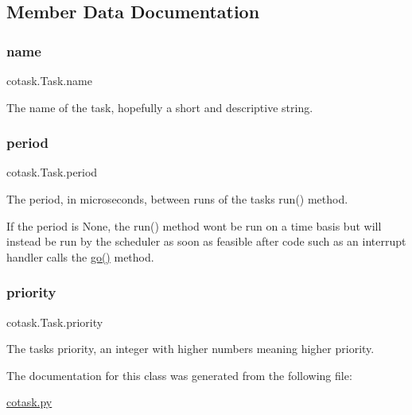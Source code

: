 \subsection{Member Data Documentation}
\mbox{\label{classcotask_1_1Task_ab54e069dd0b4f0a2f8e7f00c94998a10}} 
\subsubsection{\texorpdfstring{name}{name}}
{\footnotesize\ttfamily cotask.\+Task.\+name}



The name of the task, hopefully a short and descriptive string. 

\mbox{\label{classcotask_1_1Task_a44f980f61f1908764c6821fa886590ca}} 
\subsubsection{\texorpdfstring{period}{period}}
{\footnotesize\ttfamily cotask.\+Task.\+period}



The period, in microseconds, between runs of the task\textquotesingle{}s {\ttfamily run()} method. 

If the period is {\ttfamily None}, the {\ttfamily run()} method won\textquotesingle{}t be run on a time basis but will instead be run by the scheduler as soon as feasible after code such as an interrupt handler calls the {\ttfamily \mbox{\hyperlink{classcotask_1_1Task_a78e74d18a5ba94074c2b5309394409a5}{go()}}} method. \mbox{\label{classcotask_1_1Task_aeced93c7b7d23e33de9693d278aef88b}} 
\subsubsection{\texorpdfstring{priority}{priority}}
{\footnotesize\ttfamily cotask.\+Task.\+priority}



The task\textquotesingle{}s priority, an integer with higher numbers meaning higher priority. 



The documentation for this class was generated from the following file\+:\begin{DoxyCompactItemize}
\item 
\mbox{\hyperlink{cotask_8py}{cotask.\+py}}\end{DoxyCompactItemize}
